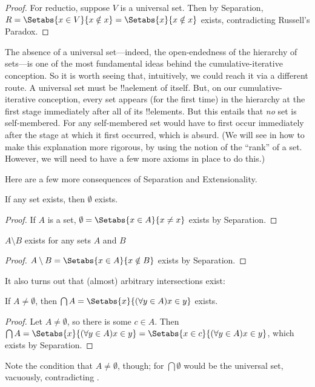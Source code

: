 \documentclass[../../../include/open-logic-section]{subfiles}
\begin{document}
\begin{proof}
For reductio, suppose $V$ is a universal set. Then by Separation, $R =
\Setabs{x \in V}{x \notin x} = \Setabs{x}{x \notin x}$ exists,
contradicting Russell's Paradox.
\end{proof}

The absence of a universal set---indeed, the open-endedness of the
hierarchy of sets---is one of the most fundamental ideas behind the
cumulative-iterative conception. So it is worth seeing that,
intuitively, we could reach it via a different route. A universal set
must be !!a{element} of itself. But, on our cumulative-iterative
conception, every set appears (for the first time) in the hierarchy at
the first stage immediately after all of its !!{element}s. But this
entails that \emph{no} set is self-membered. For any self-membered set
would have to first occur immediately after the stage at which it
first occurred, which is absurd. (We will see in
 how to make this explanation
more rigorous, by using the notion of the ``rank'' of a set. However,
we will need to have a few more axioms in place to do this.)

Here are a few more consequences of Separation and Extensionality.

\begin{prop}
If any set exists, then $\emptyset$ exists.
\end{prop}

\begin{proof}
If $A$ is a set, $\emptyset = \Setabs{x \in A}{x \neq x}$ exists by Separation.
\end{proof}

\begin{prop}
$A \setminus B$ exists for any sets $A$ and $B$
\end{prop}

\begin{proof}
$A \setminus B = \Setabs{x \in A}{x \notin B}$ exists by Separation.
\end{proof}

It also turns out that (almost) arbitrary intersections exist:

\begin{prop}
If $A \neq \emptyset$, then $\bigcap A = \Setabs{x}{(\forall y \in A)x \in y}$ exists.
\end{prop}

\begin{proof}
Let $A \neq \emptyset$, so there is some $c \in A$. Then $\bigcap A =
\Setabs{x}{(\forall y \in A)x \in y} = \Setabs{x \in c}{(\forall y \in
A)x \in y}$, which exists by Separation. 
\end{proof}

Note the condition that $A \neq \emptyset$, though; for $\bigcap
\emptyset$ would be the universal set, vacuously, contradicting
.
\end{document}
